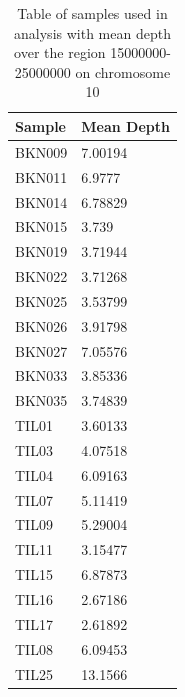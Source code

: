 \begin{table}
\begin{center}
	\begin{tabular} { | p{5cm} | p{5cm} | }
	\hline
	\textbf{Sample} & \textbf{Mean Depth} \\ \hline \hline
	BKN009 & 7.00194 \\ \hline
	BKN011 & 6.9777 \\ \hline
	BKN014 & 6.78829 \\ \hline
	BKN015 & 3.739 \\ \hline
	BKN019 & 3.71944 \\ \hline
	BKN022 & 3.71268 \\ \hline
	BKN025 & 3.53799 \\ \hline
	BKN026 & 3.91798 \\ \hline
	BKN027 & 7.05576 \\ \hline
	BKN033 & 3.85336 \\ \hline
	BKN035 & 3.74839 \\ \hline
	TIL01 & 3.60133 \\ \hline
	TIL03 & 4.07518 \\ \hline
	TIL04 & 6.09163 \\ \hline
	TIL07 & 5.11419 \\ \hline
	TIL09 & 5.29004 \\ \hline
	TIL11 & 3.15477 \\ \hline
	TIL15 & 6.87873 \\ \hline
	TIL16 & 2.67186 \\ \hline
	TIL17 & 2.61892 \\ \hline
	TIL08 & 6.09453 \\ \hline
	TIL25 & 13.1566 \\ \hline
	\end{tabular}
	\caption{Table of samples used in analysis with mean depth over the region 15000000-25000000 on chromosome 10}
	\label{tab:samples}
	\end{center}
\end{table}
